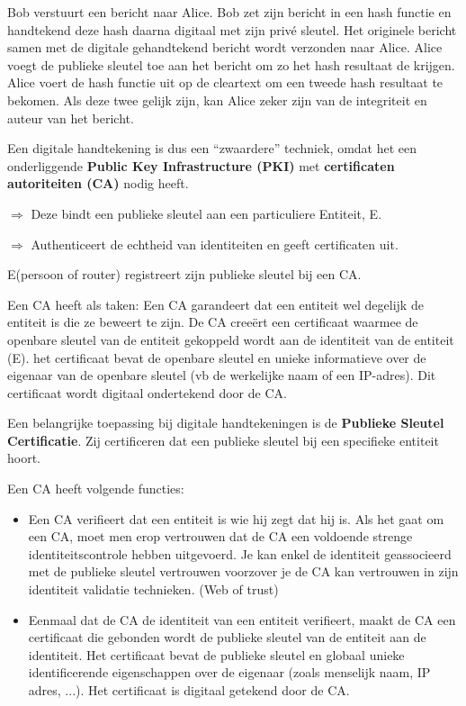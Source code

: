\noindent Bob verstuurt een bericht naar Alice. Bob zet zijn bericht in een hash functie en handtekend deze hash daarna digitaal met zijn privé sleutel. Het originele bericht samen met de digitale gehandtekend bericht wordt verzonden naar Alice. Alice voegt de publieke sleutel toe aan het bericht om zo het hash resultaat de krijgen. Alice voert de hash functie uit op de cleartext om een tweede hash resultaat te bekomen. Als deze twee gelijk zijn, kan Alice zeker zijn van de integriteit en auteur van het bericht.

\noindent Een digitale handtekening is dus een “zwaardere” techniek, omdat het een onderliggende \textbf{Public Key Infrastructure (PKI)} met \textbf{certificaten autoriteiten (CA)} nodig heeft.


\noindent $\Rightarrow$ Deze bindt een publieke sleutel aan een particuliere Entiteit, E.

\noindent $\Rightarrow$ Authenticeert de echtheid van identiteiten en geeft certificaten uit.

\noindent E(persoon of router) registreert zijn publieke sleutel bij een CA.

\noindent Een CA heeft als taken:
\bi
\itf Een CA garandeert dat een entiteit wel degelijk de entiteit is die ze beweert te zijn.
\itf De CA creeërt een certificaat waarmee de openbare sleutel van de entiteit gekoppeld wordt aan de identiteit van de entiteit (E).
    \bi
    \itf het certificaat bevat de openbare sleutel en unieke informatieve over de eigenaar van de openbare sleutel (vb de werkelijke naam of een IP-adres). Dit certificaat wordt digitaal ondertekend door de CA. 
    \ei
\ei


Een belangrijke toepassing bij digitale handtekeningen is de \textbf{Publieke Sleutel Certificatie}. Zij certificeren dat een publieke sleutel bij een specifieke entiteit hoort.

\noindent Een CA heeft volgende functies:
\begin{itemize}
\item Een CA verifieert dat een entiteit is wie hij zegt dat hij is. Als het gaat om een CA, moet men erop vertrouwen dat de CA een voldoende strenge identiteitscontrole hebben uitgevoerd. Je kan enkel de identiteit geassocieerd met de publieke sleutel vertrouwen voorzover je de CA kan vertrouwen in zijn identiteit validatie technieken. (Web of trust)
\item Eenmaal dat de CA de identiteit van een entiteit verifieert, maakt de CA een certificaat die gebonden wordt de publieke sleutel van de entiteit aan de identiteit. Het certificaat bevat de publieke sleutel en globaal unieke identificerende eigenschappen over de eigenaar (zoals menselijk naam, IP adres, ...). Het certificaat is digitaal getekend door de CA.
\end{itemize}

